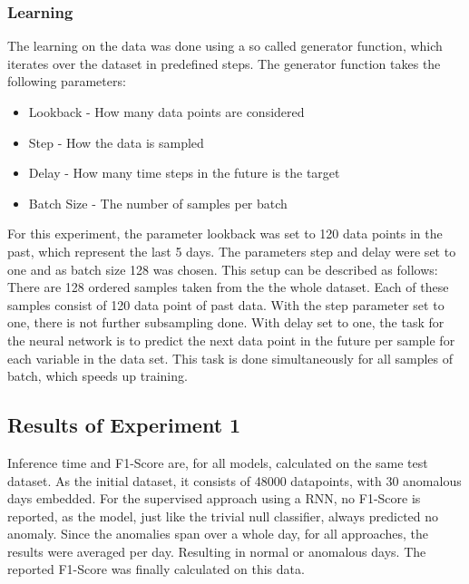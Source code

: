 \subsubsection{Learning}
The learning on the data was done using a so called generator function, which iterates over the dataset in predefined steps. The generator function takes the following parameters:

\begin{itemize}
	\item Lookback - How many data points are considered
	\item Step - How the data is sampled
	\item Delay - How many time steps in the future is the target
	\item Batch Size - The number of samples per batch
\end{itemize}

For this experiment, the parameter lookback was set to 120 data points in the past, which represent the last 5 days. The parameters step and delay were set to one and as batch size 128 was chosen. This setup can be described as follows: There are 128 ordered samples taken from the the whole dataset. Each of these samples consist of 120 data point of past data. With the step parameter set to one, there is not further subsampling done. With delay set to one, the task for the neural network is to predict the next data point in the future per sample for each variable in the data set. This task is done simultaneously for all samples of batch, which speeds up training.

\subsection{Results of Experiment 1}

Inference time and F1-Score are, for all models, calculated on the same test dataset. As the initial dataset, it consists of 48000 datapoints, with 30 anomalous days embedded. For the supervised approach using a RNN, no F1-Score is reported, as the model, just like the trivial null classifier, always predicted no anomaly. Since the anomalies span over a whole day, for all approaches, the results were averaged per day. Resulting in normal or anomalous days. The reported F1-Score was finally calculated on this data. 


